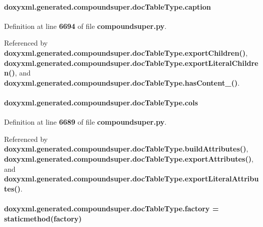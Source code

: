 \paragraph[{caption}]{\setlength{\rightskip}{0pt plus 5cm}doxyxml.\+generated.\+compoundsuper.\+doc\+Table\+Type.\+caption}\label{classdoxyxml_1_1generated_1_1compoundsuper_1_1docTableType_a27151d084c1b4aa599fbe1fb1b9749c2}


Definition at line {\bf 6694} of file {\bf compoundsuper.\+py}.



Referenced by {\bf doxyxml.\+generated.\+compoundsuper.\+doc\+Table\+Type.\+export\+Children()}, {\bf doxyxml.\+generated.\+compoundsuper.\+doc\+Table\+Type.\+export\+Literal\+Children()}, and {\bf doxyxml.\+generated.\+compoundsuper.\+doc\+Table\+Type.\+has\+Content\+\_\+()}.

\paragraph[{cols}]{\setlength{\rightskip}{0pt plus 5cm}doxyxml.\+generated.\+compoundsuper.\+doc\+Table\+Type.\+cols}\label{classdoxyxml_1_1generated_1_1compoundsuper_1_1docTableType_a9e028a8d9270b0256d33422e71c6cb90}


Definition at line {\bf 6689} of file {\bf compoundsuper.\+py}.



Referenced by {\bf doxyxml.\+generated.\+compoundsuper.\+doc\+Table\+Type.\+build\+Attributes()}, {\bf doxyxml.\+generated.\+compoundsuper.\+doc\+Table\+Type.\+export\+Attributes()}, and {\bf doxyxml.\+generated.\+compoundsuper.\+doc\+Table\+Type.\+export\+Literal\+Attributes()}.

\paragraph[{factory}]{\setlength{\rightskip}{0pt plus 5cm}doxyxml.\+generated.\+compoundsuper.\+doc\+Table\+Type.\+factory = staticmethod(factory)\hspace{0.3cm}{\ttfamily [static]}}\label{classdoxyxml_1_1generated_1_1compoundsuper_1_1docTableType_aa41f2c059fb4c6f8d27cac0f7dc64677}



